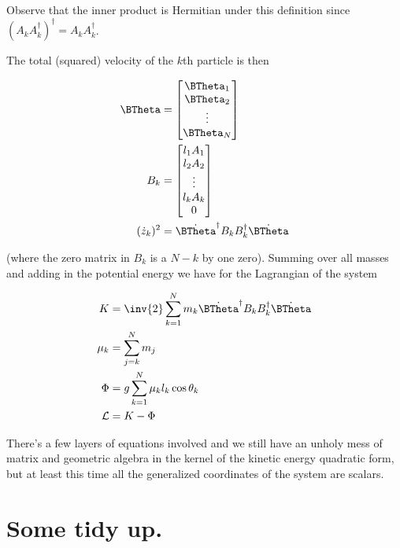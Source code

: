 Observe that the inner product is Hermitian under this definition since $(A_k A_k^\dagger)^\dagger = A_k A_k^\dagger$.

The total (squared) velocity of the $k$th particle is then

\begin{align}\label{eqn:multiPendulumSpherical2:boo4}
\BTheta &=
\begin{bmatrix}
\BTheta_1 \\
\BTheta_2 \\
\vdots \\
\BTheta_N \\
\end{bmatrix} \\
B_k &=
\begin{bmatrix}
l_1 A_1 \\
l_2 A_2 \\
\vdots \\
l_k A_k \\
0 \\
\end{bmatrix} \\
(\dot{z}_k)^2 &=
\dot{\BTheta}^\dagger B_k B_k^\dagger \dot{\BTheta}
\end{align}

(where the zero matrix in $B_k$ is a $N-k$ by one zero).  Summing over all masses and adding in the potential energy we have for the Lagrangian of the system


\begin{align}\label{eqn:multiPendulumSpherical2:boo5b}
K &=
\inv{2} \sum_{k=1}^N m_k
\dot{\BTheta}^\dagger
B_k B_k^\dagger
\dot{\BTheta} \\
\mu_k &= \sum_{j=k}^N m_j \\
\Phi &=
g \sum_{k=1}^N \mu_k l_k \cos\theta_k \\
\LL &= K - \Phi
\end{align}

There's a few layers of equations involved and we still have an unholy mess of matrix and geometric algebra in the kernel of the kinetic energy quadratic form, but at least this time all the generalized coordinates of the system are scalars.

\section{Some tidy up.}

